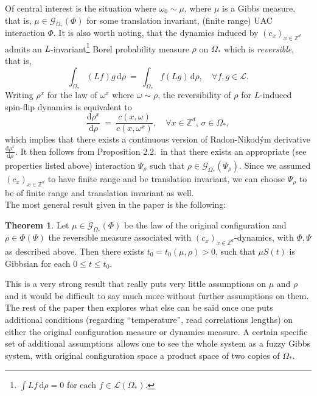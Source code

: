\documentclass[12pt]{article}
\renewcommand{\d}{\mathrm{d}}
\newcommand{\G}{\mathcal{G}}
\newcommand{\Loc}{\mathcal{L}}
\newcommand{\Z}{\mathbb{Z}}
\newcommand{\1}{\mathbbm{1}}
\newcommand{\5}{\vspace{0.5cm}}
\theoremstyle{definition}
\newtheorem{thm}{Theorem}[section]
\begin{document}
Of central interest is the situation where $\omega_0\sim\mu$, where $\mu$ is a Gibbs measure, that is, $\mu\in\G_{\Omega_*}(\Phi)$ for some translation invariant, (finite range) UAC interaction $\Phi$. It is also worth noting, that the dynamics induced by $(c_x)_{x\in\Z^d}$ admits an $L$-invariant\footnote{$\int Lf\,\d\rho=0$ for each $f\in\Loc(\Omega_*)$.} Borel probability measure $\rho$ on $\Omega_*$ which is \textit{reversible}, that is,
$$\int_{\Omega_*}(Lf)g\,\d\rho ~=~ \int_{\Omega_*}f(Lg)\,\d\rho, \quad \forall f,g\in\Loc.$$
Writing $\rho^x$ for the law of $\omega^x$ where $\omega\sim\rho$, the reversibility of $\rho$ for $L$-induced spin-flip dynamics is equivalent to
$$\frac{\d\rho^x}{\d\rho} ~=~ \frac{c(x,\omega)}{c(x,\omega^x)}, \quad \forall x\in\Z^d,\,\sigma\in\Omega_*,$$
which implies that there exists a continuous version of Radon-Nikod\'ym derivative $\frac{\d\rho^x}{\d\rho}$. It then follows from Proposition 2.2.~in \cite{EFHR} that there exists an appropriate (see properties listed above) interaction $\Psi_\rho$ such that $\rho\in\G_{\Omega_*}(\Psi_\rho)$. Since we assumed $(c_{x})_{x\in\Z^d}$ to have finite range and be translation invariant, we can choose $\Psi_\rho$ to be of finite range and translation invariant as well.\\

The most general result given in the paper is the following:

\begin{thm}
Let $\mu\in\G_{\Omega_*}(\Phi)$ be the law of the original configuration and $\rho\in\Phi(\Psi)$ the reversible measure associated with $(c_x)_{x\in\Z^d}$-dynamics, with $\Phi,\Psi$ as described above. Then there exists $t_0=t_0(\mu,\rho)>0$, such that $\mu S(t)$ is Gibbsian for each $0\leq t\leq t_0$. 
\end{thm}

This is a very strong result that really puts very little assumptions on $\mu$ and $\rho$ and it would be difficult to say much more without further assumptions on them. The rest of the paper then explores what else can be said once one puts additional conditions (regarding ``temperature'', read correlations lengths) on either the original configuration measure or dynamics measure. A certain specific set of additional assumptions allows one to see the whole system as a fuzzy Gibbs system, with original configuration space a product space of two copies of $\Omega_*$.
 
\end{document}
